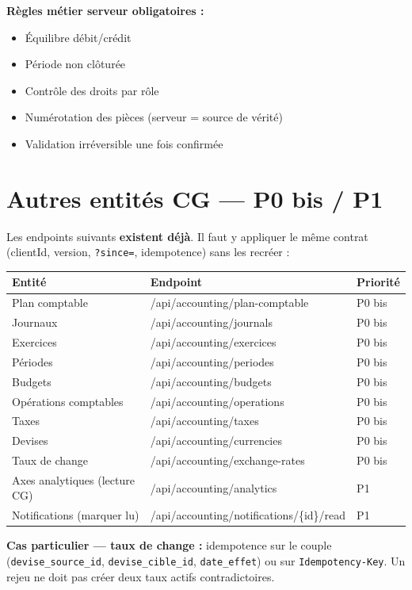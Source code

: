 \documentclass[12pt,a4paper]{report}
\begin{document}
\textbf{Règles métier serveur obligatoires :}
\begin{itemize}
  \item Équilibre débit/crédit
  \item Période non clôturée
  \item Contrôle des droits par rôle
  \item Numérotation des pièces (serveur = source de vérité)
  \item Validation irréversible une fois confirmée
\end{itemize}

\section{Autres entités CG --- P0 bis / P1}

Les endpoints suivants \textbf{existent déjà}. Il faut y appliquer le même contrat (clientId, version, \texttt{?since=}, idempotence) sans les recréer :

\begin{longtable}{@{}p{3.5cm}p{6cm}p{3.5cm}@{}}
\hline
\textbf{Entité} & \textbf{Endpoint} & \textbf{Priorité} \\
\hline
\endhead
Plan comptable & /api/accounting/plan-comptable & P0 bis \\
\hline
Journaux & /api/accounting/journals & P0 bis \\
\hline
Exercices & /api/accounting/exercices & P0 bis \\
\hline
Périodes & /api/accounting/periodes & P0 bis \\
\hline
Budgets & /api/accounting/budgets & P0 bis \\
\hline
Opérations comptables & /api/accounting/operations & P0 bis \\
\hline
Taxes & /api/accounting/taxes & P0 bis \\
\hline
Devises & /api/accounting/currencies & P0 bis \\
\hline
Taux de change & /api/accounting/exchange-rates & P0 bis \\
\hline
Axes analytiques (lecture CG) & /api/accounting/analytics & P1 \\
\hline
Notifications (marquer lu) & /api/accounting/notifications/\{id\}/read & P1 \\
\hline
\end{longtable}

\textbf{Cas particulier --- taux de change :} idempotence sur le couple (\texttt{devise\_source\_id}, \texttt{devise\_cible\_id}, \texttt{date\_effet}) ou sur \texttt{Idempotency-Key}. Un rejeu ne doit pas créer deux taux actifs contradictoires.
\end{document}
